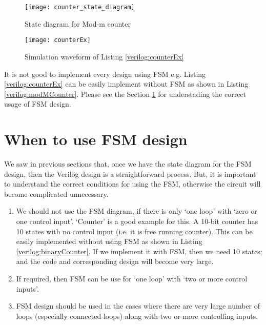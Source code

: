 \begin{figure}[!h]
	\centering
	\texttt{[image: counter\_state\_diagram]}
	\caption{State diagram for Mod-m counter}
	\label{fig:counter_state_diagram}
\end{figure}

\begin{figure}[!h]
	\centering
	\texttt{[image: counterEx]}
	\caption{Simulation waveform of Listing \ref{verilog:counterEx}}
	\label{fig:counterEx}
\end{figure}

\begin{noNumBox}
	It is not good to implement every design using FSM e.g. Listing \ref{verilog:counterEx} can be easily implement without FSM as shown in Listing \ref{verilog:modMCounter}. Please see the Section \ref{sec:whentouseFsm} for understading the correct usage of FSM design. 
\end{noNumBox}




\section{When to use FSM design}\label{sec:whentouseFsm}
We saw in previous sections that, once we have the state diagram for the FSM design, then the Verilog design is a straightforward process. But, it is important to understand the correct conditions for using the FSM, otherwise the circuit will become complicated unnecessary. 

\begin{enumerate}
	\item We should not use the FSM diagram, if there is only `one loop' with `zero or one control input'. `Counter' is a good example for this. A 10-bit counter has 10 states with no control input (i.e. it is free running counter). This can be easily implemented without using FSM as shown in Listing \ref{verilog:binaryCounter}. If we implement it with FSM, then we need 10 states; and the code and corresponding design will become very large. 
	
	\item If required, then FSM can be use for `one loop' with `two or more control inputs'. 
	
	\item FSM design should be used in the cases where there are very large number of loops (especially connected loops) along with two or more controlling inputs. 
	
\end{enumerate}


